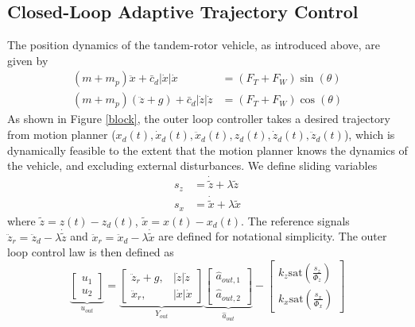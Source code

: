 \documentclass[letterpaper, 10 pt, conference]{ieeeconf}\usepackage[margin=1in]{geometry}
\begin{document}
\subsection{Closed-Loop Adaptive Trajectory Control}
The position dynamics of the tandem-rotor vehicle, as introduced above, are given by
\begin{align}
	(m+m_p) \ddot x + \bar{c}_d |\dot x| \dot x &= (F_T + F_W) \sin(\theta) \\
	(m+m_p) (\ddot z + g) + \bar{c}_d |\dot z| \dot z &= (F_T + F_W) \cos(\theta)
\end{align}
As shown in Figure \ref{block}, the outer loop controller takes a desired trajectory from motion planner ($x_d(t), \dot x_d(t), \ddot x_d(t), z_d(t), \dot z_d(t), \ddot z_d(t)$), which is dynamically feasible to the extent that the motion planner knows the dynamics of the vehicle, and excluding external disturbances. We define sliding variables
\begin{align}
	s_z &= \dot{\tilde{z}} + \lambda \tilde z \\
	s_x &= \dot{\tilde{x}} + \lambda \tilde x
\end{align}
where $\tilde{z} = z(t) - z_d(t)$, $\tilde{x} = x(t) - x_d(t)$. The reference signals $\ddot{z}_r = \ddot{z}_d - \lambda \dot{\tilde{z}}$ and $\ddot{x}_r = \ddot{x}_d - \lambda \dot{\tilde{x}}$ are defined for notational simplicity. The outer loop control law is then defined as
\begin{equation}
	\underbrace{\begin{bmatrix}
		u_1 \\ u_2
	\end{bmatrix}}_{u_{out}} = \underbrace{\begin{bmatrix}
		\ddot{z}_r + g, & |\dot z|\dot z \\ \ddot{x}_r, & |\dot x|\dot x 
	\end{bmatrix}}_{Y_{out}} \underbrace{\begin{bmatrix}
		\hat{a}_{out,1} \\
		\hat{a}_{out,2}
	\end{bmatrix}}_{\hat{a}_{out}} - \begin{bmatrix}
		k_z \text{sat}(\frac{s_z}{\Phi_z}) \\ k_x \text{sat}(\frac{s_x}{\Phi_x})
	\end{bmatrix} 
\end{equation}
\end{document}

